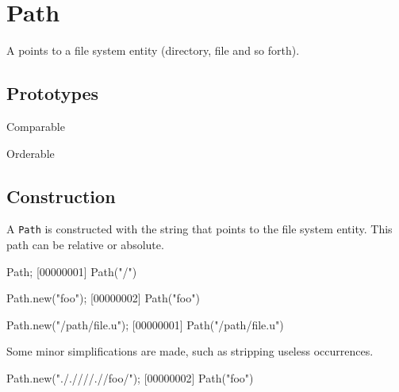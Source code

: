 
\section{Path}

A  points to a file system entity (directory, file and so
forth).

\subsection{Prototypes}
\begin{refObjects}
\item[Comparable]
\item[Orderable]
\end{refObjects}

\subsection{Construction}

A \lstinline|Path| is constructed with the string that points to the
file system entity. This path can be relative or absolute.

\begin{urbiscript}[firstnumber=1]
Path;
[00000001] Path("/")

Path.new("foo");
[00000002] Path("foo")

Path.new("/path/file.u");
[00000001] Path("/path/file.u")
\end{urbiscript}

Some minor simplifications are made, such as stripping useless
 occurrences.

\begin{urbiscript}
Path.new("././///.//foo/");
[00000002] Path("foo")
\end{urbiscript}

